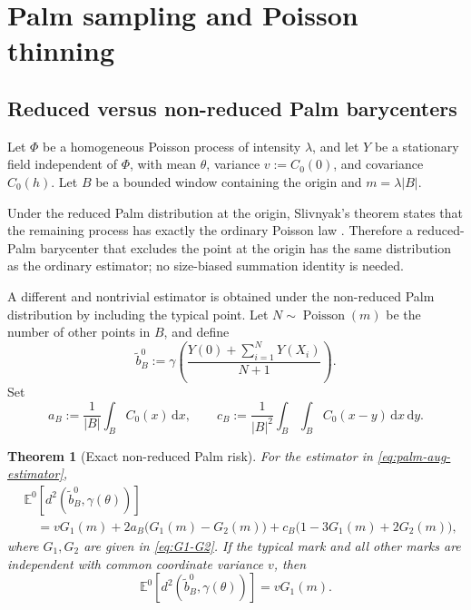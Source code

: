\documentclass[11pt,a4paper]{article}
\newtheorem{theorem}{Theorem}[section]
\theoremstyle{remark}
\newcommand{\EE}{\mathbb E}
\begin{document}
\section{Palm sampling and Poisson thinning}
\label{sec:palm-thinning}

\subsection{Reduced versus non-reduced Palm barycenters}

Let \(\Phi\) be a homogeneous Poisson process of intensity \(\lambda\), and let \(Y\) be a stationary field independent of \(\Phi\), with mean \(\theta\), variance \(v:=C_0(0)\), and covariance \(C_0(h)\).  Let \(B\) be a bounded window containing the origin and \(m=\lambda|B|\).

Under the reduced Palm distribution at the origin, Slivnyak's theorem states that the remaining process has exactly the ordinary Poisson law \cite{lastpenrose2017,chiu2013}.  Therefore a reduced-Palm barycenter that excludes the point at the origin has the same distribution as the ordinary estimator; no size-biased summation identity is needed.

A different and nontrivial estimator is obtained under the non-reduced Palm distribution by including the typical point.  Let \(N\sim\operatorname{Poisson}(m)\) be the number of other points in \(B\), and define
\begin{equation}
\label{eq:palm-aug-estimator}
 \widetilde b_B^0
 :=\gamma\!\left(
 \frac{Y(0)+\sum_{i=1}^{N}Y(X_i)}{N+1}
 \right).
\end{equation}
Set
\begin{equation}
\label{eq:a-c-palm}
 a_B:=\frac1{|B|}\int_B C_0(x)\,\mathrm dx,
 \qquad
 c_B:=\frac1{|B|^2}\int_B\int_B C_0(x-y)\,\mathrm dx\,\mathrm dy.
\end{equation}

\begin{theorem}[Exact non-reduced Palm risk]
\label{thm:palm-risk}
For the estimator in \eqref{eq:palm-aug-estimator},
\begin{align}
\label{eq:palm-risk}
 &\EE^0\!\left[d^2\!\left(\widetilde b_B^0,\gamma(\theta)\right)\right]\\
 &\quad=vG_1(m)
 +2a_B\bigl(G_1(m)-G_2(m)\bigr)
 +c_B\bigl(1-3G_1(m)+2G_2(m)\bigr),\nonumber
\end{align}
where \(G_1,G_2\) are given in \eqref{eq:G1-G2}.  If the typical mark and all other marks are independent with common coordinate variance \(v\), then
\begin{equation}
\label{eq:palm-iid}
 \EE^0[d^2(\widetilde b_B^0,\gamma(\theta))]=vG_1(m).
\end{equation}
\end{theorem}
\end{document}
